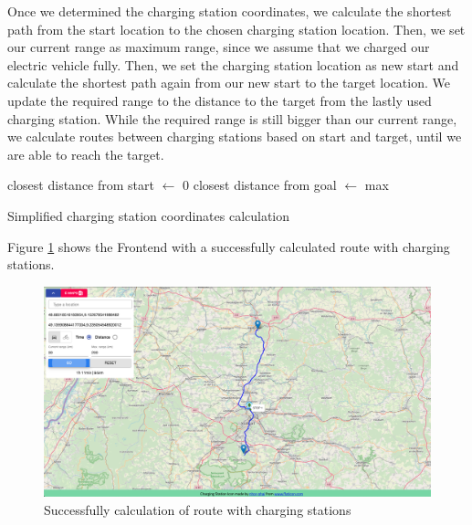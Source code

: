 \documentclass[a4paper]{article}
\begin{document}
Once we determined the charging station coordinates, we calculate the shortest path from the start location to the chosen charging station location.
Then, we set our current range as maximum range, since we assume that we charged our electric vehicle fully.
Then, we set the charging station location as new start and calculate the shortest path again from our new start to the target location.
We update the required range to the distance to the target from the lastly used charging station.
While the required range is still bigger than our current range, we calculate routes between charging stations based on start and target, until we are able to reach the target.
\par\bigskip
\begin{algorithm}[H]
closest distance from start $\leftarrow$ 0\;
closest distance from goal $\leftarrow$ max\;
 \caption{Simplified charging station coordinates calculation}
 \label{alg:charg}
\end{algorithm}\par\bigskip
Figure \ref{fig:success} shows the Frontend with a successfully calculated route with charging stations.\\
\begin{figure}[h]
    \centering
    \includegraphics[scale=0.25]{figures/success}
    \caption{Successfully calculation of route with charging stations}
    \label{fig:success}
\end{figure}
\end{document}

